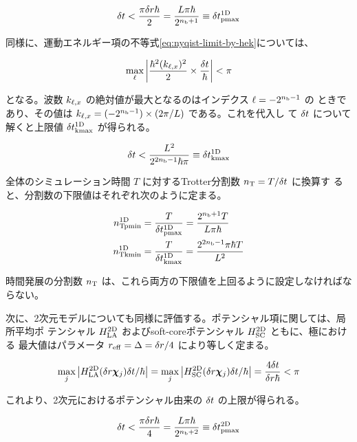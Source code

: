 \documentclass[wabun2025.tex]{subfiles}
\begin{document}
\begin{equation}
\delta t < \frac{\pi\delta r\hbar}{2}=\frac{L\pi\hbar}{2^{n_{\mathrm{b}}+1}}\equiv\delta t_{\mathrm{pmax}}^{\mathrm{1D}}
 \label{eq:nyqist-limit-by-hep-final}
\end{equation}

同様に、運動エネルギー項の不等式\eqref{eq:nyqist-limit-by-hek}については、

\begin{equation}
\max_{\ell}{\left| \frac{\hbar^2(k_{\ell,x})^2}{2}\times\frac{\delta t}{\hbar} \right|} < \pi
\label{eq:nyqist-limit-by-hek-maximum}
\end{equation}

となる。波数 $k_{\ell,x}$ の絶対値が最大となるのはインデクス $\ell = -2^{n_{\mathrm{b}}-1}$ の
ときであり、その値は $k_{\ell,x} = (-2^{n_{\mathrm{b}}-1})\times(2\pi/L)$ である。これを代入し
て $\delta t$ について解くと上限値 $\delta t_{\mathrm{kmax}}^{\mathrm{1D}}$ が得られる。

\begin{equation}
\delta t < \frac{L^2}{2^{2n_{\mathrm{b}}-1}\hbar\pi}\equiv\delta t_{\mathrm{kmax}}^{\mathrm{1D}}
 \label{eq:nyqist-limit-by-hek-final}
\end{equation}

全体のシミュレーション時間 $T$ に対するTrotter分割数 $n_{\mathrm{T}} = T/\delta t$ に換算す
ると、分割数の下限値はそれぞれ次のように定まる。

\begin{align}
    n_{\mathrm{Tpmin}}^{\mathrm{1D}} &= \frac{T}{\delta t_{\mathrm{pmax}}^{\mathrm{1D}}}=\frac{2^{n_{\mathrm{b}}+1}T}{L\pi\hbar}
    \label{eq:nT-pmin-definition}\\
    n_{\mathrm{Tkmin}}^{\mathrm{1D}} &= \frac{T}{\delta t_{\mathrm{kmax}}^{\mathrm{1D}}}=\frac{2^{2n_{\mathrm{b}}-1}\pi\hbar T}{L^2}
    \label{eq:nT-kmin-definition}
\end{align}

時間発展の分割数 $n_{\mathrm{T}}$ は、これら両方の下限値を上回るように設定しなければならない。

次に、2次元モデルについても同様に評価する。ポテンシャル項に関しては、局所平均ポ
テンシャル $H_{\mathrm{LA}}^{\mathrm{2D}}$ およびsoft-coreポテンシャル $H_{\mathrm{SC}}^{\mathrm{2D}}$ ともに、極における
最大値はパラメータ $r_{\mathrm{eff}}=\Delta=\delta r/4$ により等しく定まる。

\begin{equation}
\max_{j}{\left| H_{\mathrm{LA}}^{\mathrm{2D}}(\delta r\bm{\chi}_{j})\delta t/\hbar \right|}
  = \max_{j}{\left| H_{\mathrm{SC}}^{\mathrm{2D}}(\delta r\bm{\chi}_{j})\delta t/\hbar \right|}
  = \frac{4\delta t}{\delta r\hbar} < \pi
\end{equation}

これより、2次元におけるポテンシャル由来の $\delta t$ の上限が得られる。

\begin{equation}
\delta t < \frac{\pi\delta r\hbar}{4}
        =\frac{L\pi\hbar}{2^{n_{\mathrm{b}}+2}}
        \equiv\delta t_{\mathrm{pmax}}^{\mathrm{2D}}
 \label{eq:nyqist-limit-by-hep-final-2D}
\end{equation}
\end{document}
